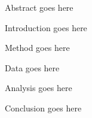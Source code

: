 
\physics

\begin{paperabs}
Abstract goes here
\end{paperabs}

\begin{paper}

Introduction goes here


Method goes here


Data goes here


Analysis goes here


Conclusion goes here
\end{paper}
